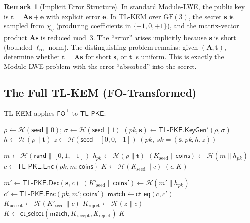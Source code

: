 \documentclass[11pt,a4paper]{article}
\theoremstyle{definition}
\newtheorem{remark}[theorem]{Remark}
\newcommand{\GF}{\mathrm{GF}(3)}
\newcommand{\KeyGen}{\textsf{KeyGen}}
\newcommand{\Enc}{\textsf{Enc}}
\newcommand{\Dec}{\textsf{Dec}}
\newcommand{\Encaps}{\textsf{Encaps}}
\newcommand{\Decaps}{\textsf{Decaps}}
\newcommand{\TLKEM}{\textsf{TL-KEM}}
\newcommand{\FO}{\textsf{FO}}
\newcommand{\CPAPKE}{\textsf{TL-PKE}}
\newcommand{\Hash}{\mathcal{H}}
\begin{document}
\begin{remark}[Implicit Error Structure]
\label{rem:noise}
In standard Module-LWE, the public key is $\mathbf{t} = \mathbf{A}\mathbf{s} + \mathbf{e}$ with explicit error $\mathbf{e}$. In TL-KEM over $\GF$, the secret $\mathbf{s}$ is sampled from $\chi_\eta$ (producing coefficients in $\{-1,0,+1\}$), and the matrix-vector product $\mathbf{A}\mathbf{s}$ is reduced mod~3. The ``error'' arises implicitly because $\mathbf{s}$ is short (bounded $\ell_\infty$ norm). The distinguishing problem remains: given $(\mathbf{A}, \mathbf{t})$, determine whether $\mathbf{t} = \mathbf{A}\mathbf{s}$ for short $\mathbf{s}$, or $\mathbf{t}$ is uniform. This is exactly the Module-LWE problem with the error ``absorbed'' into the secret.
\end{remark}

\subsection{The Full TL-KEM (FO-Transformed)}
\label{sec:fo-kem}

TL-KEM applies $\FO^{\bot}$ to $\CPAPKE$:

\begin{algorithm}[H]
\caption{$\TLKEM.\KeyGen(\mathsf{seed})$ }
\label{alg:kem-keygen}
\DontPrintSemicolon
$\rho \leftarrow \Hash(\mathsf{seed} \| 0)$; $\sigma \leftarrow \Hash(\mathsf{seed} \| 1)$\;
$(pk, \mathbf{s}) \leftarrow \CPAPKE.\KeyGen'(\rho, \sigma)$\;
$h \leftarrow \Hash(\rho \| \mathbf{t})$ 
$z \leftarrow \Hash(\mathsf{seed} \| [0,0,-1])$ 
\Return $\left(pk,\; sk = (\mathbf{s}, pk, h, z)\right)$
\end{algorithm}

\begin{algorithm}[H]
\caption{$\TLKEM.\Encaps(pk, \mathsf{rand})$ }
\label{alg:kem-encaps}
\DontPrintSemicolon
$m \leftarrow \Hash(\mathsf{rand} \| [0,1,-1])$ 
$h_{pk} \leftarrow \Hash(\rho \| \mathbf{t})$\;
$(K_{\text{seed}} \| \mathsf{coins}) \leftarrow \Hash(m \| h_{pk})$ 
$c \leftarrow \CPAPKE.\Enc(pk, m; \mathsf{coins})$\;
$K \leftarrow \Hash(K_{\text{seed}} \| c)$ 
\Return $(c, K)$
\end{algorithm}

\begin{algorithm}[H]
\caption{$\TLKEM.\Decaps(sk, c)$ }
\label{alg:kem-decaps}
\DontPrintSemicolon
$m' \leftarrow \CPAPKE.\Dec(\mathbf{s}, c)$\;
$(K'_{\text{seed}} \| \mathsf{coins}') \leftarrow \Hash(m' \| h_{pk})$\;
$c' \leftarrow \CPAPKE.\Enc(pk, m'; \mathsf{coins}')$ 
$\mathsf{match} \leftarrow \textsf{ct\_eq}(c, c')$ 
$K_{\text{accept}} \leftarrow \Hash(K'_{\text{seed}} \| c)$\;
$K_{\text{reject}} \leftarrow \Hash(z \| c)$ 
$K \leftarrow \textsf{ct\_select}(\mathsf{match}, K_{\text{accept}}, K_{\text{reject}})$ 
\Return $K$
\end{algorithm}
\end{document}
